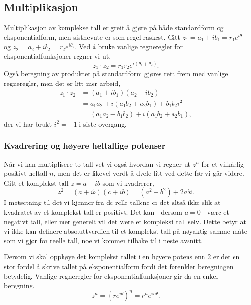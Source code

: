\documentclass[a4paper,norsk,12pt]{article}
\newcounter{exa}
\begin{document}
\subsection{Multiplikasjon}
Multiplikasjon av komplekse tall er greit å gjøre på både standardform og eksponentialform, men sistnevnte er som regel raskest. Gitt $z_1 = a_1 + ib_1 = r_1e^{i\theta_1}$ og $z_2 = a_2+ib_2 = r_2e^{i\theta_2}$. Ved å bruke vanlige regneregler for eksponentialfunksjoner regner vi ut,
\begin{displaymath}
	z_1\cdot z_2 = r_1r_2e^{i(\theta_1+\theta_2)}.
\end{displaymath}
Også beregning av produktet på standardform gjøres rett frem med vanlige regneregler, men det er litt mer arbeid,
\begin{align*}
	z_1\cdot z_2 &= (a_1+ib_1)(a_2+ib_2) \\
		&= a_1a_2 + i(a_1b_2+a_2b_1)+b_1b_2i^2 \\
		&= (a_1a_2-b_1b_2) + i (a_1b_2+a_2b_1),
\end{align*}
der vi har brukt $i^2=-1$ i siste overgang.

\begin{texample}
\end{texample}

\subsubsection{Kvadrering og høyere heltallige potenser}
Når vi kan multiplisere to tall vet vi også hvordan vi regner ut $z^n$ for et vilkårlig positivt heltall $n$, men det er likevel verdt å dvele litt ved dette før vi går videre. Gitt et komplekst tall $z=a+ib$ som vi kvadrerer,
\begin{displaymath}
	z^2 = (a+ib)(a+ib) = (a^2-b^2) +2abi.
\end{displaymath}
I motsetning til det vi kjenner fra de relle tallene er det altså ikke slik at kvadratet av et komplekst tall er positivt. Det kan---dersom $a=0$---være et negativt tall, eller mer generelt vil det være et komplekst tall selv. Dette betyr at vi ikke kan definere absoluttverdien til et komplekst tall på nøyaktig samme måte som vi gjør for reelle tall, noe vi kommer tilbake til i neste avsnitt. 

Dersom vi skal opphøye det komplekst tallet i en høyere potens enn 2 er det en stor fordel å skrive tallet på eksponentialform fordi det forenkler beregningen betydelig. Vanlige regneregler for eksponentialfunksjoner gir da en enkel beregning.
\begin{displaymath}
	z^n = \left(re^{i\theta}\right)^n = r^n e^{in\theta}.
\end{displaymath}
\end{document}
